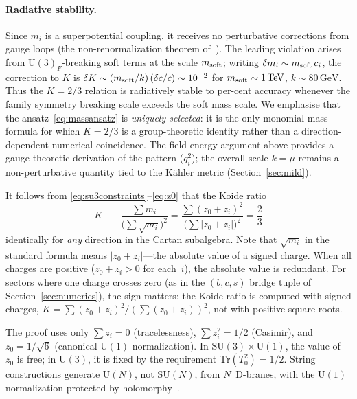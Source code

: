 \documentclass[12pt,a4paper]{article}
\newcommand{\SU}{\mathrm{SU}}
\newcommand{\UU}{\mathrm{U}}
\newcommand{\Tr}{\mathrm{Tr}}
\newcommand{\GeV}{\,\mathrm{GeV}}
\newcommand{\TeV}{\,\mathrm{TeV}}
\begin{document}
\paragraph{Radiative stability.}
Since $m_i$ is a superpotential coupling, it receives no
perturbative corrections from gauge loops (the non-renormalization
theorem of~\cite{Seiberg:1993vc}). The leading violation arises
from $\UU(3)_F$-breaking soft terms at the scale $m_{\rm soft}$;
writing $\delta m_i \sim m_{\rm soft}\,c_i$, the correction to $K$
is $\delta K \sim (m_{\rm soft}/k)\,(\delta c/c) \sim 10^{-2}$
for $m_{\rm soft} \sim 1\TeV$, $k \sim 80\GeV$.
Thus the $K=2/3$ relation is radiatively stable to per-cent accuracy
whenever the family symmetry breaking scale exceeds the soft mass scale.
We emphasise that the ansatz~\eqref{eq:massansatz} is
\emph{uniquely selected}: it is the only monomial mass formula
for which $K=2/3$ is a group-theoretic identity rather
than a direction-dependent numerical coincidence.
The field-energy argument above provides a gauge-theoretic
derivation of the pattern ($q_i^2$); the overall scale
$k = \mu$ remains a non-perturbative quantity tied to
the K\"ahler metric (Section~\ref{sec:mild}).

It follows from
\eqref{eq:su3constraints}--\eqref{eq:z0} that the Koide ratio
\begin{equation}
  K \;\equiv\; \frac{\sum m_i}{\bigl(\sum\sqrt{m_i}\bigr)^2}
  = \frac{\sum (z_0{+}z_i)^2}{\bigl(\sum |z_0{+}z_i|\bigr)^2}
  = \frac{2}{3}
  \label{eq:K23}
\end{equation}
identically for \emph{any} direction in the Cartan subalgebra.
Note that $\sqrt{m_i}$ in the standard formula means
$|z_0 + z_i|$---the absolute value of a signed charge. When all
charges are positive ($z_0 + z_i > 0$ for each~$i$), the
absolute value is redundant.
For sectors where one charge crosses zero (as in the $(b,c,s)$
bridge tuple of Section~\ref{sec:numerics}), the sign matters:
the Koide ratio is computed with signed charges,
$K = \sum(z_0{+}z_i)^2/(\sum(z_0{+}z_i))^2$, not with positive
square roots.

The proof uses only $\sum z_i = 0$ (tracelessness), $\sum z_i^2 = 1/2$
(Casimir), and $z_0 = 1/\sqrt{6}$ (canonical $\UU(1)$ normalization).
In $\SU(3) \times \UU(1)$, the value of $z_0$ is free; in $\UU(3)$, it
is fixed by the requirement $\Tr(T_0^2) = 1/2$. String constructions
generate $\UU(N)$, not $\SU(N)$, from $N$~D-branes, with the
$\UU(1)$ normalization protected by
holomorphy~\cite{Polchinski:1998rr}.
\end{document}
